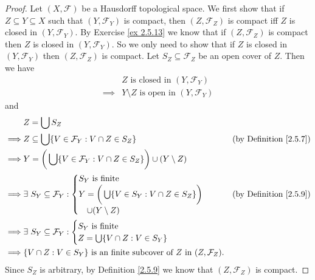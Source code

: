 \begin{proof}
    Let \((X, \mathcal{F})\) be a Hausdorff topological space.
    We first show that if \(Z \subseteq Y \subseteq X\) such that \((Y, \mathcal{F}_Y)\) is compact, then \((Z, \mathcal{F}_Z)\) is compact iff \(Z\) is closed in \((Y, \mathcal{F}_Y)\).
    By Exercise \ref{ex 2.5.13} we know that if \((Z, \mathcal{F}_Z)\) is compact then \(Z\) is closed in \((Y, \mathcal{F}_Y)\).
    So we only need to show that if \(Z\) is closed in \((Y, \mathcal{F}_Y)\) then \((Z, \mathcal{F}_Z)\) is compact.
    Let \(S_Z \subseteq \mathcal{F}_Z\) be an open cover of \(Z\).
    Then we have
    \begin{align*}
                 & Z \text{ is closed in } (Y, \mathcal{F}_Y)           \\
        \implies & Y \setminus Z \text{ is open in } (Y, \mathcal{F}_Y)
    \end{align*}
    and
    \begin{align*}
                 & Z = \bigcup S_Z                                                                                                                   \\
        \implies & Z \subseteq \bigcup \{V \in \mathcal{F}_Y : V \cap Z \in S_Z\}                               & \text{(by Definition \ref{2.5.7})} \\
        \implies & Y = \bigg(\bigcup \{V \in \mathcal{F}_Y : V \cap Z \in S_Z\}\bigg) \cup (Y \setminus Z)                                           \\
        \implies & \exists\ S_Y \subseteq \mathcal{F}_Y : \begin{cases}
            S_Y \text{ is finite}                                    \\
            Y = \bigg(\bigcup \{V \in S_Y : V \cap Z \in S_Z\}\bigg) \\
            \quad \cup (Y \setminus Z)
        \end{cases}                           & \text{(by Definition \ref{2.5.9})} \\
        \implies & \exists\ S_Y \subseteq \mathcal{F}_Y : \begin{cases}
            S_Y \text{ is finite} \\
            Z = \bigcup \{V \cap Z : V \in S_Y\}
        \end{cases}                                                                \\
        \implies & \{V \cap Z : V \in S_Y\} \text{ is an finite subcover of } Z \text{ in } (Z, \mathcal{F}_Z).
    \end{align*}
    Since \(S_Z\) is arbitrary, by Definition \ref{2.5.9} we know that \((Z, \mathcal{F}_Z)\) is compact.


\end{proof}
